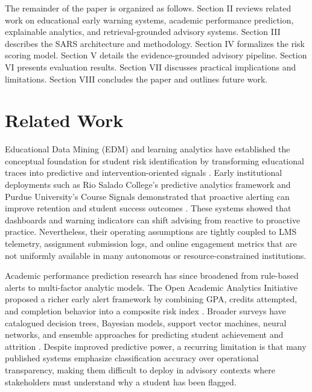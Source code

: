 \documentclass[conference]{IEEEtran}
\begin{document}
The remainder of the paper is organized as follows. Section II reviews related work on educational early warning systems, academic performance prediction, explainable analytics, and retrieval-grounded advisory systems. Section III describes the SARS architecture and methodology. Section IV formalizes the risk scoring model. Section V details the evidence-grounded advisory pipeline. Section VI presents evaluation results. Section VII discusses practical implications and limitations. Section VIII concludes the paper and outlines future work.

\section{Related Work}
Educational Data Mining (EDM) and learning analytics have established the conceptual foundation for student risk identification by transforming educational traces into predictive and intervention-oriented signals \cite{baker2014edm}. Early institutional deployments such as Rio Salado College's predictive analytics framework and Purdue University's Course Signals demonstrated that proactive alerting can improve retention and student success outcomes \cite{essa2012predictive,arnold2012course}. These systems showed that dashboards and warning indicators can shift advising from reactive to proactive practice. Nevertheless, their operating assumptions are tightly coupled to LMS telemetry, assignment submission logs, and online engagement metrics that are not uniformly available in many autonomous or resource-constrained institutions.

Academic performance prediction research has since broadened from rule-based alerts to multi-factor analytic models. The Open Academic Analytics Initiative proposed a richer early alert framework by combining GPA, credits attempted, and completion behavior into a composite risk index \cite{jayaprakash2014early}. Broader surveys have catalogued decision trees, Bayesian models, support vector machines, neural networks, and ensemble approaches for predicting student achievement and attrition \cite{romero2020survey,hussain2019predicting,summers2021predicting}. Despite improved predictive power, a recurring limitation is that many published systems emphasize classification accuracy over operational transparency, making them difficult to deploy in advisory contexts where stakeholders must understand why a student has been flagged.
\end{document}
